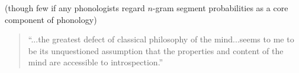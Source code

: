 
(though few if any phonologists regard $n$-gram segment probabilities as a core component of phonology)

\begin{quotation}
``...the greatest defect of classical philosophy of the mind...seems to me to be its unquestioned assumption that the properties and content of the mind are accessible to introspection.'' \citep[][22]{Chomsky1968}
\end{quotation}
